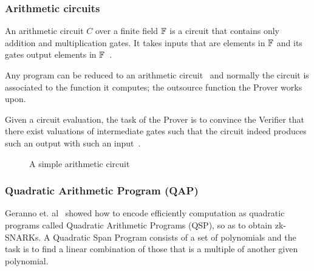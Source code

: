 \subsubsection{Arithmetic circuits}
\label{zkp:snarks:circuits}

An arithmetic circuit $C$ over a finite field $\mathbb{F}$ is a circuit that contains
only addition and multiplication gates. It takes inputs that are elements in $\mathbb{F}$ and its gates output elements in $\mathbb{F}$~\cite{184425, zcash}.

Any program  can be reduced to  an arithmetic circuit~\cite{pankova_succinct_2013, 10.1007/978-3-642-40084-1_6} and normally the circuit is associated to the function it computes; the outsource function the Prover works upon.

Given a circuit evaluation, the task of the Prover is to convince the Verifier that there exist valuations of intermediate gates such that the circuit indeed produces such an output with such an input~\cite{pankova_succinct_2013}.

\begin{figure}[ht!]
  \center
  \caption{A simple arithmetic circuit}
  \label{fig:zkp:circuit}
\end{figure}

\subsubsection{Quadratic Arithmetic Program (QAP)}
\label{zkp:snarks:qap}

Geranno et. al~\cite{ggpr} showed how to encode efficiently computation as quadratic programs called Quadratic Arithmetic Programs (QSP), so as to obtain zk-SNARKs. A Quadratic Span Program consists of a set of polynomials and the task is to find a linear combination of those that is a multiple of another given polynomial.

